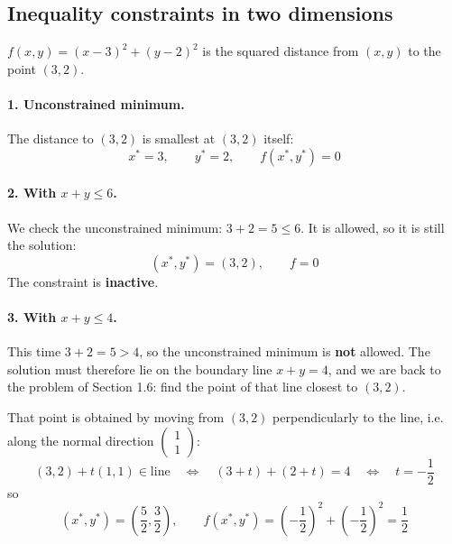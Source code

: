 \documentclass[]{article}
\begin{document}
	\subsection{Inequality constraints in two dimensions}

	$f(x,y) = (x-3)^2 + (y-2)^2$ is the squared distance from $(x,y)$ to the point $(3,2)$.

	\paragraph{1. Unconstrained minimum.}
	The distance to $(3,2)$ is smallest at $(3,2)$ itself:
	$$
	x^* = 3, \qquad y^* = 2, \qquad f(x^*,y^*) = 0
	$$

	\paragraph{2. With $x + y \leq 6$.}
	We check the unconstrained minimum: $3 + 2 = 5 \leq 6$. \checkmark
	It is allowed, so it is still the solution:
	$$
	(x^*,y^*) = (3,2), \qquad f = 0
	$$
	The constraint is \textbf{inactive}.

	\paragraph{3. With $x + y \leq 4$.}
	This time $3 + 2 = 5 > 4$, so the unconstrained minimum is \textbf{not} allowed.
	The solution must therefore lie on the boundary line $x + y = 4$, and we are back to the problem of Section 1.6: find the point of that line closest to $(3,2)$.

	That point is obtained by moving from $(3,2)$ perpendicularly to the line, i.e. along the normal direction $\begin{pmatrix} 1 \\ 1 \end{pmatrix}$:
	$$
	(3,2) + t(1,1) \in \text{line}
	\quad \Longleftrightarrow \quad
	(3+t) + (2+t) = 4
	\quad \Longleftrightarrow \quad
	t = -\frac{1}{2}
	$$
	so
	$$
	(x^*,y^*) = \left(\frac{5}{2}, \frac{3}{2}\right),
	\qquad
	f(x^*,y^*) = \left(-\frac{1}{2}\right)^2 + \left(-\frac{1}{2}\right)^2 = \frac{1}{2}
	$$
\end{document}
